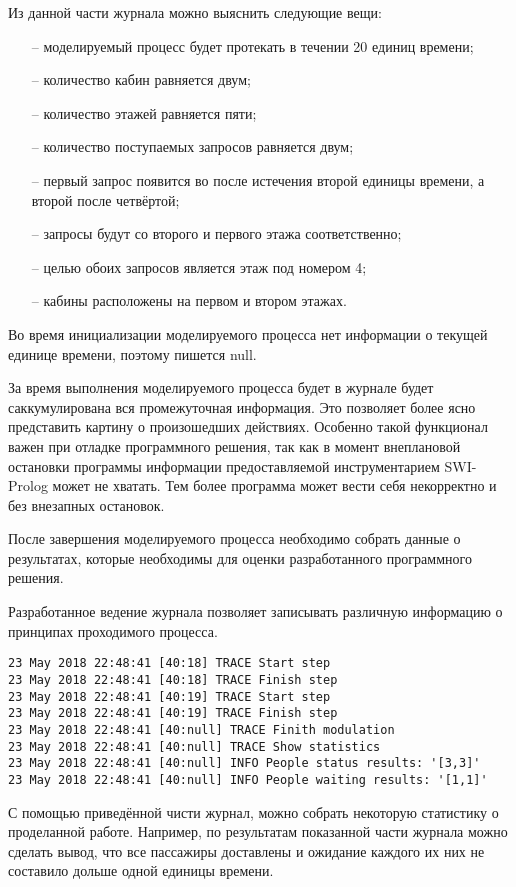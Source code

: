 	Из данной части журнала можно выяснить следующие вещи:
		\begin{itemize}
			\item[--] моделируемый процесс будет протекать в течении 20 единиц времени;
			\item[--] количество кабин равняется двум;
			\item[--] количество этажей равняется пяти;
			\item[--] количество поступаемых запросов равняется двум;
			\item[--] первый запрос появится во после истечения второй единицы времени,
				а второй после четвёртой;
			\item[--] запросы будут со второго и первого этажа соответственно;
			\item[--] целью обоих запросов является этаж под номером 4;
			\item[--] кабины расположены на первом и втором этажах.
		\end{itemize}

	Во время инициализации моделируемого процесса нет информации о текущей единице времени, поэтому пишется null.

	За время выполнения моделируемого процесса будет в журнале будет саккумулирована вся промежуточная информация.
		Это позволяет более ясно представить картину о произошедших действиях. Особенно такой функционал важен
		при отладке программного решения, так как в момент внеплановой остановки программы информации предоставляемой
		инструментарием SWI-Prolog  может не хватать. Тем более программа может вести себя некорректно
		и без внезапных остановок.

	После завершения моделируемого процесса необходимо собрать данные о результатах, которые необходимы для оценки разработанного программного решения.

	Разработанное ведение журнала позволяет записывать различную информацию о принципах проходимого процесса.
\begin{lstlisting}
23 May 2018 22:48:41 [40:18] TRACE Start step
23 May 2018 22:48:41 [40:18] TRACE Finish step
23 May 2018 22:48:41 [40:19] TRACE Start step
23 May 2018 22:48:41 [40:19] TRACE Finish step
23 May 2018 22:48:41 [40:null] TRACE Finith modulation
23 May 2018 22:48:41 [40:null] TRACE Show statistics
23 May 2018 22:48:41 [40:null] INFO People status results: '[3,3]'
23 May 2018 22:48:41 [40:null] INFO People waiting results: '[1,1]'
\end{lstlisting}

	С помощью приведённой чисти журнал, можно собрать некоторую статистику о проделанной работе. Например,
		по результатам показанной части журнала можно сделать вывод, что все пассажиры доставлены
		и ожидание каждого их них не составило дольше одной единицы времени. 

